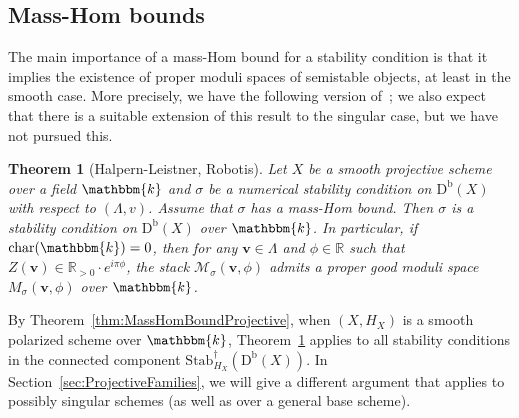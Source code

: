 \documentclass[11pt, reqno]{amsart}
\numberwithin{equation}{section}
\theoremstyle{plain}
\newtheorem{theorem}{Theorem}[section]
\theoremstyle{remark}
\theoremstyle{definition}
\theoremstyle{italicsname}
\newcommand{\bv}{\mathbf{v}}
\newcommand{\Db}{\mathrm{D^b}}
\newcommand{\Stabdagger}{\mathrm{Stab}^\dagger}
\newcommand{\cM}{\mathcal{M}}
\newcommand{\KK}{\mathbbm{k}}
\def\RR{\ensuremath{\mathbb{R}}}
\begin{document}
\subsection{Mass-Hom bounds}\label{subsection-moduli-spaces}
The main importance of a mass-Hom bound for a stability condition is that it implies the existence of proper moduli spaces of semistable objects, at least in the smooth case.
More precisely, we have the following version of~\cite[Theorem 2.35]{DHL-robotis}; we also expect that there is a suitable extension of this result to the singular case, but we have not pursued this.

\begin{theorem}[Halpern-Leistner, Robotis]\label{theorem-DHL-robotis} 
Let $X$ be a smooth projective scheme over a field $\KK$ and $\sigma$ be a numerical stability condition on $\Db(X)$ with respect to $(\Lambda,v)$.
Assume that $\sigma$ has a mass-Hom bound. 
Then $\sigma$ is a stability condition on $\Db(X)$ over $\KK$.
In particular, if $\mathrm{char}(\KK)=0$, then for any $\bv\in\Lambda$ and $\phi\in\RR$ such that $Z(\bv)\in\RR_{>0}\cdot e^{i\pi\phi}$, the stack $\cM_{\sigma}(\bv,\phi)$ admits a proper good moduli space $M_{\sigma}(\bv,\phi)$ over $\KK$. 
\end{theorem}

By Theorem~\ref{thm:MassHomBoundProjective}, when $(X, H_X)$ is a smooth polarized scheme over $\KK$, Theorem~\ref{theorem-DHL-robotis} applies to all stability conditions in the connected component $\Stabdagger_{H_X}(\Db(X))$. 
In Section~\ref{sec:ProjectiveFamilies}, we will give a different argument that applies to possibly singular schemes (as well as over a general base scheme). 
\end{document}
